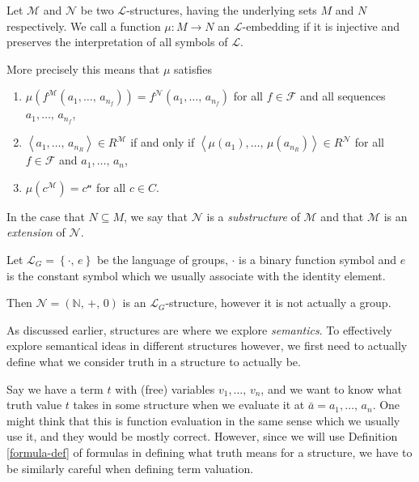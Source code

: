 \documentclass[../../main.tex]{subfiles}
\begin{document}
\begin{definition}\label{structure-embedding-def}\cite[Definition 1.1.3]{Mar02}
    Let $\mathcal{M}$ and $\mathcal{N}$ be two $\mathcal{L}$-structures, having the underlying sets $M$ and $N$ respectively.
    We call a function $\mu: M \to N$ an $\mathcal{L}$-embedding if it is injective and preserves the interpretation of all symbols of $\mathcal{L}$.

    More precisely this means that $\mu$ satisfies
    \begin{enumerate}[label=(\roman*)]
        \item $\mu\left(f^\mathcal{M}(a_1,\ldots,\, a_{n_f})\right) = f^\mathcal{N}(a_1,\ldots,\, a_{n_f})$ 
        for all $f \in \mathcal{F}$ and all sequences $a_1,\ldots,\, a_{n_f}$,
        \item $\left<a_1,\ldots,\, a_{n_R}\right> \in R^\mathcal{M}$ if and only if $\left<\mu(a_1),\ldots,\, \mu(a_{n_R})\right> \in R^\mathcal{N}$ 
        for all $f \in \mathcal{F}$ and $a_1,\ldots,\, a_n$,
        \item $\mu(c^\mathcal{M}) = c^\mathcal{n}$ for all $c \in C$.
    \end{enumerate}
    In the case that $N \subseteq M$, 
    we say that $\mathcal{N}$ is a \textit{substructure} of $\mathcal{M}$ and that $\mathcal{M}$ is an \textit{extension} of $\mathcal{N}$.
\end{definition}

\begin{example}\cite[p.8]{Mar02}
    Let $\mathcal{L}_G = \left\{\cdot,\, e\right\}$ be the language of groups, 
    $\cdot$ is a binary function symbol and $e$ is the constant symbol which we usually associate with the identity element.

    Then $\mathcal{N} = \left(\mathbb{N},\, +,\, 0\right)$ is an $\mathcal{L}_G$-structure, however it is not actually a group.
\end{example}

As discussed earlier, structures are where we explore \textit{semantics}.
To effectively explore semantical ideas in different structures however, 
we first need to actually define what we consider truth in a structure to actually be.

Say we have a term $t$ with (free) variables $v_1,\ldots,\, v_n$,
and we want to know what truth value $t$ takes in some structure when we evaluate it at $\bar{a} = a_1,\ldots,\, a_n$.
One might think that this is function evaluation in the same sense which we usually use it, and they would be mostly correct.
However, since we will use Definition \ref{formula-def} of formulas in defining what truth means for a structure,
we have to be similarly careful when defining term valuation.
\end{document}

